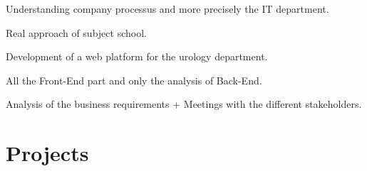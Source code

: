 \documentclass[letterpaper]{my-resume} %
\begin{document}
\begin{minipage}[t]{0.66\textwidth}

\begin{tightitemize}
\item Understanding company processus and more precisely the IT department.
\item Real approach of subject school.
\end{tightitemize}

\sectionspace %



\begin{tightitemize}
\item Development of a web platform for the urology department.
\item All the Front-End part and only the analysis of Back-End.
\item Analysis of the business requirements + Meetings with the different stakeholders.
\end{tightitemize}

\sectionspace %


\section{Projects}

\end{minipage}
\end{document}
